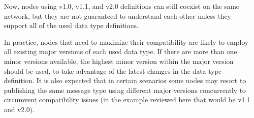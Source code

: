 Now, nodes using v1.0, v1.1, and v2.0 definitions can still coexist on the same network,
but they are not guaranteed to understand each other unless they support all of the used data type definitions.

In practice, nodes that need to maximize their compatibility are likely to employ all existing major versions of
each used data type.
If there are more than one minor versions available, the highest minor version within the major version should
be used, to take advantage of the latest changes in the data type definition.
It is also expected that in certain scenarios some nodes may resort to publishing the same message type
using different major versions concurrently to circumvent compatibility issues (in the
example reviewed here that would be v1.1 and v2.0).
